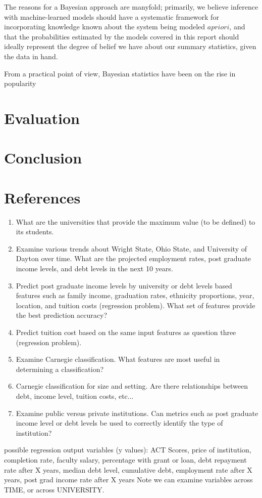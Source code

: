 \documentclass[10pt]{article}
\begin{document}
The reasons for a Bayesian approach are manyfold; primarily, we believe inference with machine-learned models should have a systematic framework for incorporating knowledge known about the system being modeled $a priori$, and that the probabilities estimated by the models covered in this report should ideally represent the degree of belief we have about our summary statistics, given the data in hand. 

From a practical point of view, Bayesian statistics have been on the rise in popularity ~\cite{ashby2006bayesian}
    
\section{Evaluation}

\section{Conclusion}
    
\section{References}


 \begin{enumerate}
    \item What are the universities that provide the maximum value (to be defined) to its students. 
    \item Examine various trends about Wright State, Ohio State, and University of Dayton over time. What are the projected employment rates, post graduate income levels, and debt levels in the next 10 years.
    \item Predict post graduate income levels by university or debt levels based features such as family income, graduation rates, ethnicity proportions,  year, location, and tuition costs (regression problem). What set of features provide the best prediction accuracy?
    \item Predict tuition cost based on the same input features as question three (regression problem).
    \item Examine Carnegie classification. What features are most useful in determining a classification?
    \item Carnegie classification for size and setting. Are there relationships between debt, income level, tuition costs, etc...
    \item Examine public versus private institutions. Can metrics such as post graduate income level or debt levels be used to correctly identify the type of institution?
\end{enumerate}
    possible regression output variables (y values): ACT Scores, price of institution, completion rate, faculty salary, percentage with grant or loan, debt repayment rate after X years, median debt level, cumulative debt, employment rate after X years, post grad income rate after X years
    Note we can examine variables across TIME, or across UNIVERSITY.
\end{document}
